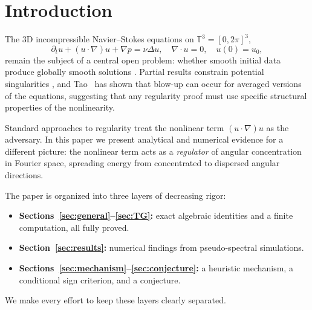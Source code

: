 \documentclass[11pt]{article}
\theoremstyle{definition}
\newcommand{\T}{\mathbb{T}}
\begin{document}
\begin{abstract}
\smallskip\noindent\textbf{Heuristic mechanism and
regularity program.}
We propose a mechanism --- the ``$-i$ rotation'' in the
advection operator --- that explains both the exact TG
result and the numerical observations, and formulate a
conjecture at the enstrophy level ($s=1$) with a concrete
connection to the regularity problem: the NS nonlinearity
simultaneously spreads angular enstrophy and limits
vortex stretching through the same phase mechanism,
suggesting a self-regulating structure that may prevent
blow-up.
\end{abstract}

\tableofcontents
\newpage

\section{Introduction}

The 3D incompressible Navier--Stokes equations on
$\T^3 = [0,2\pi]^3$,
\begin{equation}\label{eq:NS}
\partial_t u + (u\cdot\nabla)u + \nabla p = \nu\Delta u,
\quad \nabla\cdot u = 0, \quad u(0) = u_0,
\end{equation}
remain the subject of a central open problem: whether
smooth initial data produce globally smooth solutions
\cite{Fefferman,Leray}.  Partial results constrain
potential singularities \cite{ESS,BKM}, and Tao~\cite{Tao}
has shown that blow-up can occur for averaged versions of
the equations, suggesting that any regularity proof must
use specific structural properties of the nonlinearity.

Standard approaches to regularity treat the nonlinear
term $(u\cdot\nabla)u$ as the adversary.  In this paper
we present analytical and numerical evidence for a
different picture: the nonlinear term acts as a
\emph{regulator} of angular concentration in Fourier
space, spreading energy from concentrated to dispersed
angular directions.

The paper is organized into three layers of decreasing
rigor:
\begin{itemize}[leftmargin=2em]
\item \textbf{Sections~\ref{sec:general}--\ref{sec:TG}:}
  exact algebraic identities and a finite computation,
  all fully proved.
\item \textbf{Section~\ref{sec:results}:} numerical
  findings from pseudo-spectral simulations.
\item \textbf{Sections~\ref{sec:mechanism}--\ref{sec:conjecture}:}
  a heuristic mechanism, a conditional sign criterion,
  and a conjecture.
\end{itemize}
We make every effort to keep these layers clearly
separated.
\end{document}
